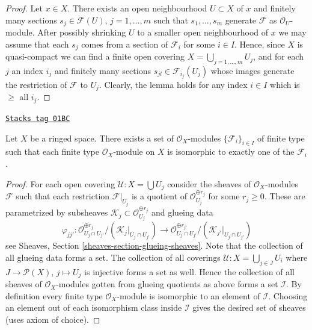 \begin{proof}
Let $x \in X$. There exists an open neighbourhood
$U \subset X$ of $x$ and finitely many sections
$s_j \in \mathcal{F}(U)$, $j = 1, \ldots, m$ such that
$s_1, \ldots, s_m$ generate $\mathcal{F}$ as $\mathcal{O}_U$-module.
After possibly shrinking $U$ to a smaller open neighbourhood of $x$
we may assume that each $s_j$ comes from a section of $\mathcal{F}_i$
for some $i \in I$.
Hence, since $X$ is quasi-compact we can find a finite open
covering $X = \bigcup_{j = 1, \ldots, m} U_j$, and for each $j$
an index $i_j$ and finitely many sections $s_{jl} \in \mathcal{F}_{i_j}(U_j)$
whose images generate the restriction of $\mathcal{F}$ to
$U_j$. Clearly, the lemma holds for any index $i \in I$ which
is $\geq$ all $i_j$.
\end{proof}

\begin{lemma}
\label{modules-lemma-set-isomorphism-classes-finite-type-modules}
\href{https://stacks.math.columbia.edu/tag/01BC}{\texttt{Stacks tag 01BC}}

Let $X$ be a ringed space.
There exists a set of $\mathcal{O}_X$-modules
$\{\mathcal{F}_i\}_{i \in I}$ of finite type
such that each finite type $\mathcal{O}_X$-module
on $X$ is isomorphic to exactly one of the $\mathcal{F}_i$.
\end{lemma}

\begin{proof}
For each open covering $\mathcal{U} : X = \bigcup U_j$ consider the
sheaves of $\mathcal{O}_X$-modules $\mathcal{F}$ such that each
restriction $\mathcal{F}|_{U_j}$ is a quotient of
$\mathcal{O}_{U_j}^{\oplus r_j}$ for some $r_j \geq 0$.
These are parametrized by subsheaves
$\mathcal{K}_j \subset \mathcal{O}_{U_j}^{\oplus r_j}$ and glueing
data
$$
\varphi_{jj'} :
\mathcal{O}_{U_j \cap U_{j'}}^{\oplus r_j}/
(\mathcal{K}_j|_{U_j \cap U_{j'}})
\longrightarrow
\mathcal{O}_{U_j \cap U_{j'}}^{\oplus r_{j'}}/
(\mathcal{K}_{j'}|_{U_j \cap U_{j'}})
$$
see Sheaves, Section \ref{sheaves-section-glueing-sheaves}.
Note that the collection of all glueing data forms a set.
The collection of all coverings $\mathcal{U} : X = \bigcup_{j \in J} U_i$
where $J \to \mathcal{P}(X)$, $j \mapsto U_j$ is injective forms a set as
well. Hence the collection of all sheaves of $\mathcal{O}_X$-modules
gotten from glueing quotients as above forms a set $\mathcal{I}$.
By definition every finite type $\mathcal{O}_X$-module
is isomorphic to an element of $\mathcal{I}$. Choosing an
element out of each isomorphism class inside $\mathcal{I}$
gives the desired set of sheaves (uses axiom of choice).
\end{proof}

